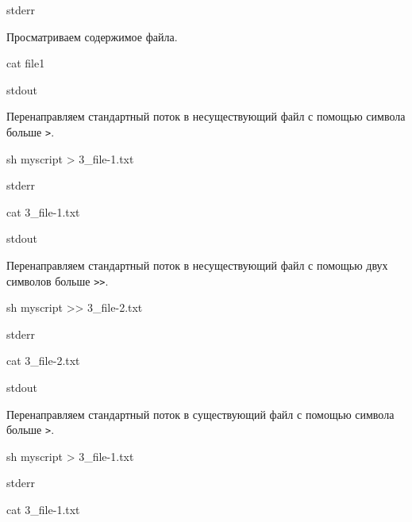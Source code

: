 \begin{OutBox}
stderr
\end{OutBox}

Просматриваем содержимое файла.

\begin{BashBox}
cat file1
\end{BashBox}

\begin{OutBox}
stdout
\end{OutBox}

Перенаправляем стандартный поток в несуществующий файл с помощью символа больше \verb|>|.

\begin{BashBox}
sh myscript > 3_file-1.txt
\end{BashBox}

\begin{OutBox}
stderr
\end{OutBox}

\begin{BashBox}
cat 3_file-1.txt
\end{BashBox}

\begin{OutBox}
stdout
\end{OutBox}

Перенаправляем стандартный поток в несуществующий файл с помощью двух символов больше \verb|>>|.

\begin{BashBox}
sh myscript >> 3_file-2.txt
\end{BashBox}

\begin{OutBox}
stderr
\end{OutBox}

\begin{BashBox}
cat 3_file-2.txt
\end{BashBox}

\begin{OutBox}
stdout
\end{OutBox}

Перенаправляем стандартный поток в существующий файл с помощью символа больше \verb|>|.

\begin{BashBox}
sh myscript > 3_file-1.txt
\end{BashBox}

\begin{OutBox}
stderr
\end{OutBox}

\begin{BashBox}
cat 3_file-1.txt
\end{BashBox}

